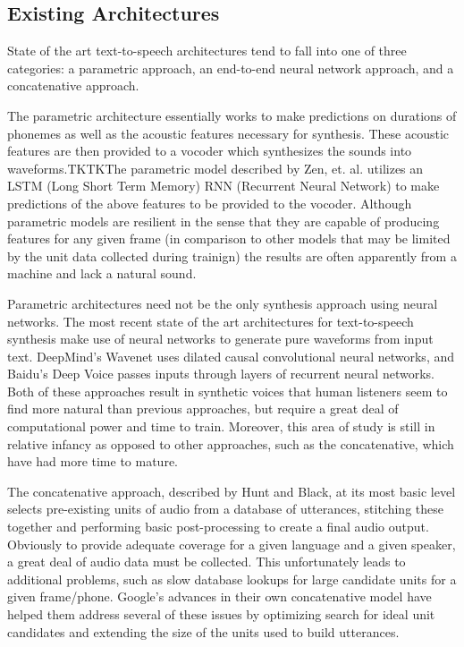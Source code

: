 \documentclass[10pt, journal, compsoc]{IEEEtran}
\begin{document}
\subsection{Existing Architectures}
State of the art text-to-speech architectures tend to fall into one of three categories: a parametric approach, an end-to-end neural network approach, and a concatenative approach.\par
The parametric architecture essentially works to make predictions on durations of phonemes as well as the acoustic features necessary for synthesis. These acoustic features are then provided to a vocoder which synthesizes the sounds into waveforms.TKTKThe parametric model described by Zen, et. al. utilizes an LSTM (Long Short Term Memory) RNN (Recurrent Neural Network) to make predictions of the above features to be provided to the vocoder.\cite{DBLP:journals/corr/ZenAEHS16} Although parametric models are resilient in the sense that they are capable of producing features for any given frame (in comparison to other models that may be limited by the unit data collected during trainign) the results are often apparently from a machine and lack a natural sound.\par
Parametric architectures need not be the only synthesis approach using neural networks. The most recent state of the art architectures for text-to-speech synthesis make use of neural networks to generate pure waveforms from input text. DeepMind's Wavenet uses dilated causal convolutional neural networks\cite{DBLP:journals/corr/ArikCCDGKLMRSS17}, and Baidu's Deep Voice passes inputs through layers of recurrent neural networks. Both of these approaches result in synthetic voices that human listeners seem to find more natural than previous approaches\cite{DBLP:journals/corr/OordDZSVGKSK16}, but require a great deal of computational power and time to train. Moreover, this area of study is still in relative infancy as opposed to other approaches, such as the concatenative, which have had more time to mature.\par
The concatenative approach, described by Hunt and Black, at its most basic level selects pre-existing units of audio from a database of utterances, stitching these together and performing basic post-processing to create a final audio output\cite{Hunt:1996:USC:1256383.1256532}. Obviously to provide adequate coverage for a given language and a given speaker, a great deal of audio data must be collected. This unfortunately leads to additional problems, such as slow database lookups for large candidate units for a given frame/phone. Google's advances in their own concatenative model have helped them address several of these issues by optimizing search for ideal unit candidates and extending the size of the units used to build utterances.\cite{45564}\par
\end{document}
